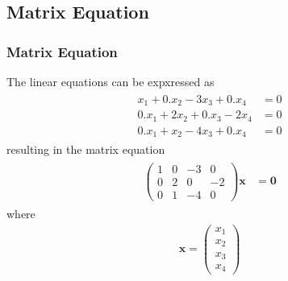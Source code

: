 \documentclass{beamer}
\theoremstyle{remark}
\newcommand{\myvec}[1]{\ensuremath{\begin{pmatrix}#1\end{pmatrix}}}
\let\vec\mathbf
\numberwithin{equation}{section}
\begin{document}
\subsection{Matrix Equation}
\begin{frame}
\frametitle{Matrix Equation}
The linear equations can be expxressed as
\begin{align}
\begin{split}
x_1 + 0.x_2 -3x_3 +0.x_4&= 0
\\
0.x_1+2x_2 +0.x_3-2x_4 &= 0
\\
0.x_1+x_2 -4x_3+ 0.x_4 &= 0
\end{split}
\end{align}
%
resulting in the matrix equation
\begin{align}
\label{eq:chem_balance_mat_eq}
\begin{split}
\myvec{
1 & 0 & -3 & 0
\\
0 & 2 & 0 & -2
\\
0 & 1 & -4 & 0
}
\vec{x} &= \vec{0}
\end{split}
\end{align}
where
\begin{align}
\vec{x} = \myvec{x_1 \\ x_2 \\ x_3 \\ x_4} 
\end{align}
\end{frame}
\end{document}

